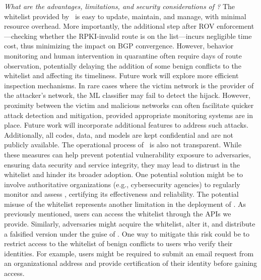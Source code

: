 \textit{What are the advantages, limitations, and security considerations of \lov?}
The whitelist provided by \lov\ is easy to update, maintain, and manage, with minimal resource overhead. More importantly, the additional step after ROV enforcement—checking whether the RPKI-invalid route is on the list—incurs negligible time cost, thus minimizing the impact on BGP convergence.
However, behavior monitoring and human intervention in quarantine often require days of route observation, potentially delaying the addition of some benign conflicts to the whitelist and affecting its timeliness. Future work will explore more efficient inspection mechanisms. In rare cases where the victim network is the provider of the attacker's network, the ML classifier may fail to detect the hijack. However, proximity between the victim and malicious networks can often facilitate quicker attack detection and mitigation, provided appropriate monitoring systems are in place. Future work will incorporate additional features to address such attacks.
Additionally, all codes, data, and models are kept confidential and are not publicly available. The operational process of \lov\ is also not transparent.
While these measures can help prevent potential vulnerability exposure to adversaries, ensuring data security and service integrity, they may lead to distrust in the whitelist and hinder its broader adoption. One potential solution might be to involve authoritative organizations (e.g., cybersecurity agencies) to regularly monitor and assess \lov, certifying its effectiveness and reliability. The potential misuse of the whitelist represents another limitation in the deployment of \lov. As previously mentioned, users can access the whitelist through the APIs we provide. Similarly, adversaries might acquire the whitelist, alter it, and distribute a falsified version under the guise of \lov.
One way to mitigate this risk could be to restrict access to the whitelist of benign conflicts to users who verify their identities. For example, users might be required to submit an email request from an organizational address and provide certification of their identity before gaining access.












